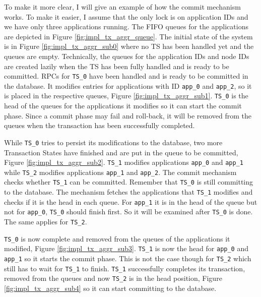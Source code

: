 To make it more clear, I will give an example of how the commit mechanism
works. To make it easier, I assume that the only lock is on
application IDs and we have only three applications running. The FIFO
queues for the applications are depicted in Figure
\ref{fig:impl_tx_aggr_queue}. The initial state of the system is in
Figure \ref{fig:impl_tx_aggr_sub0} where no TS has been handled yet
and the queues are empty. Technically, the queues for the application
IDs and node IDs are created lazily when the TS has been fully handled
and is ready to be committed. RPCs for \texttt{TS\_0} have been
handled and is ready to be committed in the database. It modifies
entries for applications with ID \texttt{app\_0} and \texttt{app\_2},
so it is placed in the respective queues, Figure
\ref{fig:impl_tx_aggr_sub1}. \texttt{TS\_0} is the head
of the queues for the applications it modifies so it can start the
commit phase. Since a commit phase may fail and roll-back, it will be
removed from the queues when the transaction has been successfully
completed.

While \texttt{TS\_0} tries to persist its modifications to the
database, two more Transaction States have finished and are put in the
queue to be committed, Figure
\ref{fig:impl_tx_aggr_sub2}. \texttt{TS\_1} modifies applications
\texttt{app\_0} and \texttt{app\_1} while \texttt{TS\_2} modifies
applications \texttt{app\_1} and \texttt{app\_2}. The commit mechanism
checks whether \texttt{TS\_1} can be committed. Remember that
\texttt{TS\_0} is still committing to the database. The mechanism
fetches the applications that \texttt{TS\_1} modifies and checks if it
is the head in each queue. For \texttt{app\_1} it is in the head of
the queue but not for \texttt{app\_0}, \texttt{TS\_0} should finish
first. So it will be examined after \texttt{TS\_0} is done. The same
applies for \texttt{TS\_2}.

\texttt{TS\_0} is now complete and removed from the queues of the
applications it modified, Figure
\ref{fig:impl_tx_aggr_sub3}. \texttt{TS\_1} is now the head for
\texttt{app\_0} and \texttt{app\_1} so it starts the commit
phase. This is not the case though for \texttt{TS\_2} which still has
to wait for \texttt{TS\_1} to finish. \texttt{TS\_1} successfully
completes its transaction, removed from the queues and now
\texttt{TS\_2} is in the head position, Figure
\ref{fig:impl_tx_aggr_sub4} so it can start committing to the database.

